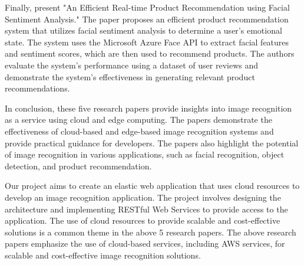 \documentclass[../main.tex]{subfiles}
\begin{document}
Finally, \citet{8869300} present "An Efficient Real-time Product Recommendation using Facial Sentiment Analysis." The paper proposes an efficient product recommendation system that utilizes facial sentiment analysis to determine a user's emotional state. The system uses the Microsoft Azure Face API to extract facial features and sentiment scores, which are then used to recommend products. The authors evaluate the system's performance using a dataset of user reviews and demonstrate the system's effectiveness in generating relevant product recommendations.

In conclusion, these five research papers provide insights into image recognition as a service using cloud and edge computing. The papers demonstrate the effectiveness of cloud-based and edge-based image recognition systems and provide practical guidance for developers. The papers also highlight the potential of image recognition in various applications, such as facial recognition, object detection, and product recommendation.

Our project aims to create an elastic web application that uses cloud resources to develop an image recognition application. The project involves designing the architecture and implementing RESTful Web Services to provide access to the application. The use of cloud resources to provide scalable and cost-effective solutions is a common theme in the above 5 research papers. The above research papers emphasize the use of cloud-based services, including AWS services, for scalable and cost-effective image recognition solutions.

\clearpage
\end{document}
